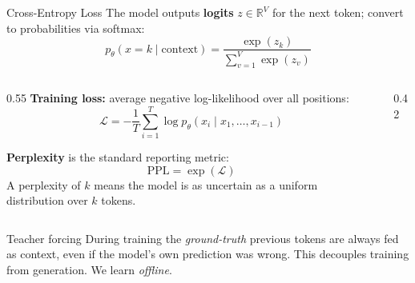 \begin{frame}{Cross-Entropy Loss}
  The model outputs \textbf{logits} $z \in \mathbb{R}^V$ for the next token; convert to probabilities via softmax:
  \[
    p_\theta(x = k \mid \text{context}) = \frac{\exp(z_k)}{\sum_{v=1}^{V} \exp(z_v)}
  \]

  \begin{columns}[T]
    \begin{column}{0.55\textwidth}
      \textbf{Training loss:} average negative log-likelihood over all positions:
      \[
        \mathcal{L} = -\frac{1}{T} \sum_{i=1}^{T} \log p_\theta(x_i \mid x_1, \ldots, x_{i-1})
      \]

      \textbf{Perplexity} is the standard reporting metric:
      \[
        \mathrm{PPL} = \exp(\mathcal{L})
      \]
      A perplexity of $k$ means the model is as uncertain as a uniform distribution over $k$ tokens.
    \end{column}
    \begin{column}{0.42\textwidth}
    \end{column}
  \end{columns}

  \begin{block}{Teacher forcing}
    During training the \emph{ground-truth} previous tokens are always fed as context, even if the model's own prediction was wrong.
      This decouples training from generation. We learn \emph{offline}.
  \end{block}
\end{frame}


